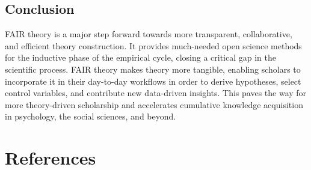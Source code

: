 \documentclass[
  man, noextraspace,floatsintext]{apa6}
\begin{document}
\subsection{Conclusion}\label{conclusion}

FAIR theory is a major step forward towards more transparent, collaborative, and efficient theory construction.
It provides much-needed open science methods for the inductive phase of the empirical cycle,
closing a critical gap in the scientific process.
FAIR theory makes theory more tangible, enabling scholars to incorporate it in their day-to-day workflows in order to derive hypotheses, select control variables, and contribute new data-driven insights.
This paves the way for more theory-driven scholarship
and accelerates cumulative knowledge acquisition in psychology, the social sciences, and beyond.

\newpage

\section{References}\label{references}
\end{document}
